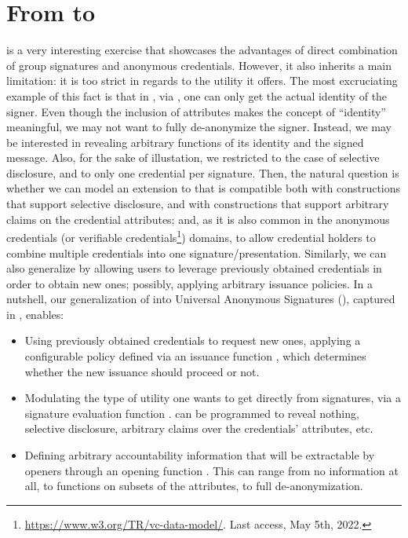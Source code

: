 \section{From \GSAC to \UAS}
\label{sec:uas}

\GSAC is a very interesting exercise that showcases the advantages of direct
combination of group signatures and anonymous credentials. However, it also
inherits a main limitation: it is too strict in regards to the utility it
offers. The most excruciating example of this fact is that in \GSAC, via \Open,
one can only get the actual identity of the signer. Even though the inclusion
of attributes makes the concept of ``identity'' meaningful, we
may not want to fully de-anonymize the signer. Instead, we may be interested in
revealing arbitrary functions of its identity and the signed message. Also, for
the sake of illustation, we restricted to the case of selective disclosure, and
to only one credential per signature. Then, the natural question is whether we
can model an extension to \GSAC that is compatible both with constructions
that support selective disclosure, and with constructions that support arbitrary
claims on the
credential attributes; and, as it is also common in the anonymous credentials
(or verifiable credentials\footnote{\url{https://www.w3.org/TR/vc-data-model/}.
  Last access, May 5th, 2022.}) domains, to allow credential holders to
combine multiple credentials into one signature/presentation. Similarly, we can
also generalize \GSAC by allowing users to leverage previously obtained
credentials in order to obtain new ones; possibly, applying arbitrary issuance
policies. In a nutshell, our generalization of \GSAC into Universal Anonymous
Signatures (\UAS), captured in , enables:

\begin{itemize}
\item Using previously obtained credentials to request new ones, applying a
  configurable policy defined via an issuance function \fissue, which determines
  whether the new issuance should proceed or not.
\item Modulating the type of utility one wants to get directly from signatures,
  via a signature evaluation function \feval. \feval can be programmed to reveal
  nothing, selective disclosure, arbitrary claims over the credentials'
  attributes, etc.
\item Defining arbitrary accountability information that will be extractable by
  openers through an opening function \finsp. This can range from no information
  at all, to functions on subsets of the attributes, to full de-anonymization.
\end{itemize}

